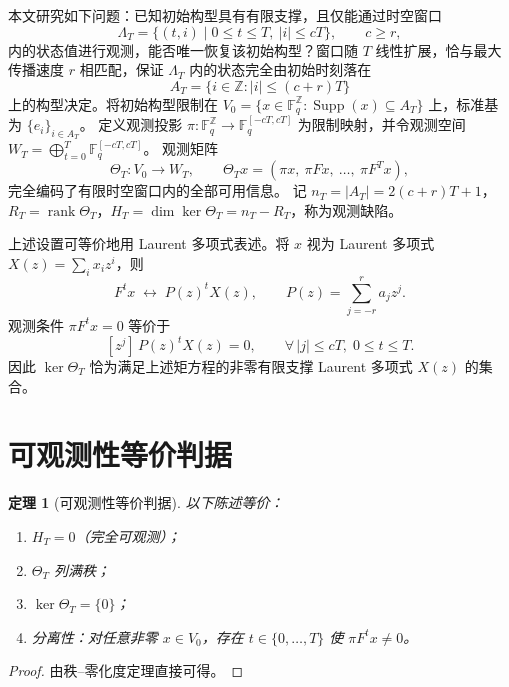 \documentclass[11pt,a4paper]{ctexart}
\newtheorem{theorem}{定理}[section]
\newcommand{\F}{\mathbb{F}}
\newcommand{\Z}{\mathbb{Z}}
\DeclareMathOperator{\rank}{rank}
\DeclareMathOperator{\Supp}{Supp}
\begin{document}
本文研究如下问题：已知初始构型具有有限支撑，且仅能通过时空窗口
\begin{equation}\label{eq:window}
    \Lambda_T = \{(t,i)\mid 0\le t\le T,\ |i|\le cT\},\qquad c\ge r,
\end{equation}
内的状态值进行观测，能否唯一恢复该初始构型？窗口随 \(T\) 线性扩展，恰与最大传播速度 \(r\) 相匹配，保证 \(\Lambda_T\) 内的状态完全由初始时刻落在
\begin{equation}
    A_T = \{i\in\Z : |i|\le (c+r)T\}
\end{equation}
上的构型决定。将初始构型限制在 \(V_0 = \{x\in\F_q^{\Z}:\Supp(x)\subseteq A_T\}\) 上，标准基为 \(\{e_i\}_{i\in A_T}\)。
定义观测投影 \(\pi:\F_q^{\Z}\to \F_q^{[-cT,cT]}\) 为限制映射，并令观测空间 \(W_T = \bigoplus_{t=0}^T \F_q^{[-cT,cT]}\)。
观测矩阵
\begin{equation}\label{eq:Theta_def}
    \Theta_T : V_0 \longrightarrow W_T,\qquad
    \Theta_T x = (\pi x,\ \pi F x,\ \dots,\ \pi F^T x),
\end{equation}
完全编码了有限时空窗口内的全部可用信息。
记 \(n_T = |A_T| = 2(c+r)T+1\)，\(R_T = \rank \Theta_T\)，\(H_T = \dim\ker\Theta_T = n_T - R_T\)，称为观测缺陷。

上述设置可等价地用 Laurent 多项式表述。将 \(x\) 视为 Laurent 多项式 \(X(z)=\sum_i x_i z^i\)，则
\[
F^t x \;\longleftrightarrow\; P(z)^t X(z),\qquad P(z)=\sum_{j=-r}^{r} a_j z^j.
\]
观测条件 \(\pi F^t x = 0\) 等价于
\begin{equation}\label{eq:moment}
    [z^j]\, P(z)^t X(z) = 0,\qquad \forall\,|j|\le cT,\; 0\le t\le T.
\end{equation}
因此 \(\ker\Theta_T\) 恰为满足上述矩方程的非零有限支撑 Laurent 多项式 \(X(z)\) 的集合。

\section{可观测性等价判据}
\begin{theorem}[可观测性等价判据]\label{thm:equivalent}
以下陈述等价：
\begin{enumerate}[label=(\roman*)]
    \item \(H_T=0\)（完全可观测）；
    \item \(\Theta_T\) 列满秩；
    \item \(\ker\Theta_T = \{0\}\)；
    \item 分离性：对任意非零 \(x\in V_0\)，存在 \(t\in\{0,\dots,T\}\) 使 \(\pi F^t x \neq 0\)。
\end{enumerate}
\end{theorem}
\begin{proof}
由秩–零化度定理直接可得。
\end{proof}
\end{document}
